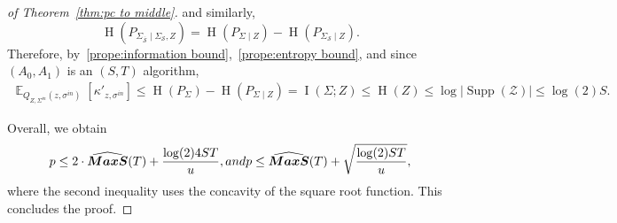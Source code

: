 \documentclass[10pt,a4paper]{amsart}
\DeclareMathOperator*{\E}{\mathbb{E}}
\DeclareMathOperator{\HH}{H}
\DeclareMathOperator{\I}{I}
\newcommand{\MAXS}{\boldsymbol{MaxS}}
\DeclareMathOperator{\Supp}{\text{Supp}}
\begin{document}
\begin{proof} [of Theorem~\ref{thm:pc to middle}]
and similarly,
$$
\HH(P_{ \Sigma_{\overline{\mathcal{S}}} \mid \Sigma_{\mathcal{S}},Z} ) = 
\HH(P_{ \Sigma \mid Z} ) - 
\HH(P_{ \Sigma_{\mathcal{S}} \mid Z}). 
$$
Therefore, by~\ref{prope:information bound},~\ref{prope:entropy bound},
and since $(A_0,A_1)$ is an $(S,T)$ algorithm,
\begin{align*} 
\E_{Q_{Z,\Sigma^{in}}(z, \sigma^{in} )} [ \kappa'_{z,\sigma^{in} } ] \leq
\HH(P_{\Sigma}) - \HH(P_{\Sigma \mid Z} ) = \I(\Sigma ; Z) \leq
\HH(Z) \leq 
\log|\Supp(\mathcal{Z})| \leq \log(2) S.
\end{align*}

Overall, we obtain 
$$ 
p \leq 
2 \cdot \widehat{\MAXS}(T) + \frac{\log(2) 4 S T }{u},
\textup{ and }
p \leq 
\widehat{\MAXS}(T) + 
\sqrt{\frac{\log(2) ST} {{u}}},
$$
where the second inequality uses the concavity of the square root function.
This concludes the proof.
\end{proof}
\end{document}
